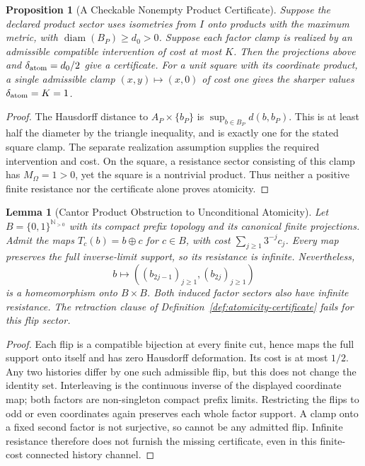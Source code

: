 \documentclass[11pt,a4paper]{article}
\theoremstyle{plain}
\newtheorem{lemma}[theorem]{Lemma}
\newtheorem{proposition}[theorem]{Proposition}
\theoremstyle{definition}
\theoremstyle{remark}
\begin{document}
\begin{proposition}[A Checkable Nonempty Product Certificate]\label{prop:product-clamp-certificate}
Suppose the declared product sector uses isometries from $I$ onto products with the maximum metric, with $\operatorname{diam}(B_P)\ge d_0>0$. Suppose each factor clamp is realized by an admissible compatible intervention of cost at most $K$. Then the projections above and $\delta_{\rm atom}=d_0/2$ give a certificate. For a unit square with its coordinate product, a single admissible clamp $(x,y)\mapsto(x,0)$ of cost one gives the sharper values $\delta_{\rm atom}=K=1$.
\end{proposition}
\begin{proof}
The Hausdorff distance to $A_P\times\{b_P\}$ is $\sup_{b\in B_P}d(b,b_P)$. This is at least half the diameter by the triangle inequality, and is exactly one for the stated square clamp. The separate realization assumption supplies the required intervention and cost. On the square, a resistance sector consisting of this clamp has $M_\Omega=1>0$, yet the square is a nontrivial product. Thus neither a positive finite resistance nor the certificate alone proves atomicity.
\end{proof}

\begin{lemma}[Cantor Product Obstruction to Unconditional Atomicity]\label{lem:cantor-product-obstruction}
Let $B=\{0,1\}^{\mathbb N_{>0}}$ with its compact prefix topology and its canonical finite projections. Admit the maps $T_c(b)=b\mathbin\oplus c$ for $c\in B$, with cost $\sum_{j\ge1}3^{-j}c_j$. Every map preserves the full inverse-limit support, so its resistance is infinite. Nevertheless,
\[
 b\longmapsto((b_{2j-1})_{j\ge1},(b_{2j})_{j\ge1})
\]
is a homeomorphism onto $B\times B$. Both induced factor sectors also have infinite resistance. The retraction clause of Definition~\ref{def:atomicity-certificate} fails for this flip sector.
\end{lemma}
\begin{proof}
Each flip is a compatible bijection at every finite cut, hence maps the full support onto itself and has zero Hausdorff deformation. Its cost is at most $1/2$. Any two histories differ by one such admissible flip, but this does not change the identity set. Interleaving is the continuous inverse of the displayed coordinate map; both factors are non-singleton compact prefix limits. Restricting the flips to odd or even coordinates again preserves each whole factor support. A clamp onto a fixed second factor is not surjective, so cannot be any admitted flip. Infinite resistance therefore does not furnish the missing certificate, even in this finite-cost connected history channel.
\end{proof}
\end{document}
